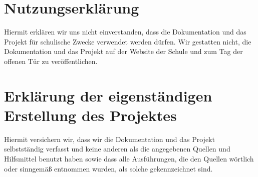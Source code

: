 \documentclass[11pt, oneside, halfparskip, smallheadings, automark]{scrreprt}
\begin{document}


\tableofcontents

%









\begingroup
\let\clearpage\relax

\newpage

\listoffigures
\lstlistoflistings
\listoftables

\newpage

\chapter*{Nutzungserklärung}
Hiermit erklären wir uns nicht einverstanden, dass die Dokumentation und das Projekt für
schulische Zwecke verwendet werden dürfen. Wir gestatten nicht, die Dokumentation und das Projekt auf der Website der Schule und zum Tag der offenen Tür zu veröffentlichen.

\chapter*{Erklärung der eigenständigen Erstellung des Projektes}
Hiermit versichern wir, dass wir die Dokumentation und das Projekt selbstständig verfasst und
keine anderen als die angegebenen Quellen und Hilfsmittel benutzt haben sowie dass alle
Ausführungen, die den Quellen wörtlich oder sinngemäß entnommen wurden, als solche
gekennzeichnet sind.
\endgroup
\end{document}
